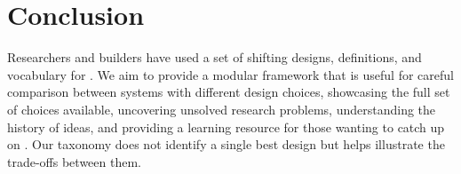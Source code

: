 

\section{Conclusion}

Researchers and builders have used a set of shifting designs, definitions, and vocabulary for \depms. We aim to provide a modular framework that is useful for careful comparison between systems with different design choices, showcasing the full set of choices available, uncovering unsolved research problems, understanding the history of \depm ideas, and providing a learning resource for those wanting to catch up on \depms. Our taxonomy does not identify a single best design but helps illustrate the trade-offs between them. 



